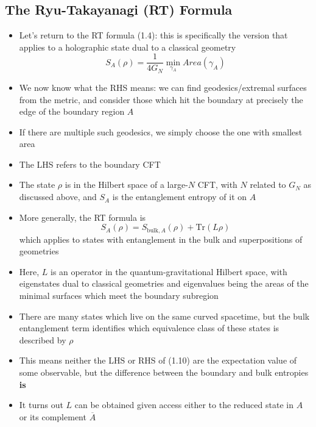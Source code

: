 \documentclass[12pt,a4paper]{article}
\numberwithin{equation}{section}
\begin{document}
	\subsection{The Ryu-Takayanagi (RT) Formula}
	\begin{itemize}
		\item Let's return to the RT formula (1.4): this is specifically the version that applies to a holographic state dual to a classical geometry
		\begin{equation}
			S_{A}(\rho)=\frac{1}{4G_{N}}\min_{\gamma_{A}}{Area(\gamma_{A})}
		\end{equation}
		\item We now know what the RHS means: we can find geodesics/extremal surfaces from the metric, and consider those which hit the boundary at precisely the edge of the boundary region $A$
		\item If there are multiple such geodesics, we simply choose the one with smallest area
		\item The LHS refers to the boundary CFT
		\item The state $\rho$ is in the Hilbert space of a large-$N$ CFT, with $N$ related to $G_{N}$ as discussed above, and $S_{A}$ is the entanglement entropy of it on $A$
		\item More generally, the RT formula is
		\begin{equation}
			S_{A}(\rho)=S_{\text{bulk},A}(\rho)+\text{Tr}(L\rho)
		\end{equation}
		which applies to states with entanglement in the bulk and superpositions of geometries
		\item Here, $L$ is an operator in the quantum-gravitational Hilbert space, with eigenstates dual to classical geometries and eigenvalues being the areas of the minimal surfaces which meet the boundary subregion
		\item There are many states which live on the same curved spacetime, but the bulk entanglement term identifies which equivalence class of these states is described by $\rho$
		\item This means neither the LHS or RHS of (1.10) are the expectation value of some observable, but the difference between the boundary and bulk entropies \textbf{is}
		\item It turns out $L$ can be obtained given access either to the reduced state in $A$ or its complement $\overline{A}$
	\end{itemize}
\end{document}
